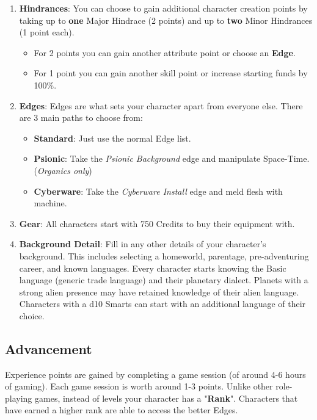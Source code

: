 \begin{enumerate}
  \item \textbf{Hindrances}: You can choose to gain additional character creation points by taking up to \textbf{one} Major Hindrace (2 points) and up to \textbf{two} Minor Hindrances (1 point each).
    \begin{itemize}
        \item For 2 points you can gain another attribute point or choose an \textbf{Edge}.
        \item For 1 point you can gain another skill point or increase starting funds by 100\%.
    \end{itemize}

  \item \textbf{Edges}: Edges are what sets your character apart from everyone else. There are 3 main paths to choose from:
    \begin{itemize}
        \item \textbf{Standard}: Just use the normal Edge list.
        \item \textbf{Psionic}: Take the \textit{Psionic Background} edge and manipulate Space-Time. (\textit{Organics only})
        \item \textbf{Cyberware}: Take the \textit{Cyberware Install} edge and meld flesh with machine.
    \end{itemize}

  \item \textbf{Gear}: All characters start with 750 Credits to buy their equipment with.

  \item \textbf{Background Detail}: Fill in any other details of your character's background. This includes selecting a homeworld, parentage, pre-adventuring career, and known languages. Every character starts knowing the Basic language (generic trade language) and their planetary dialect. Planets with a strong alien presence may have retained knowledge of their alien language. Characters with a d10 Smarts can start with an additional language of their choice.
  
\end{enumerate}

\subsection{Advancement}

Experience points are gained by completing a game session (of around 4-6 hours of gaming). Each game session is worth around 1-3 points. Unlike other role-playing games, instead of levels your character has a "\textbf{Rank}". Characters that have earned a higher rank are able to access the better Edges.

